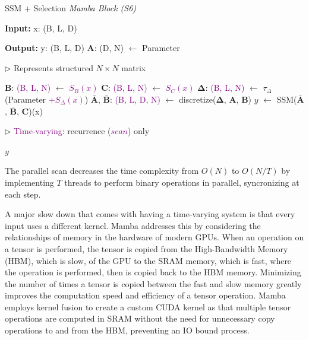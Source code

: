 \documentclass[conference]{IEEEtran}
\newcommand{\mbfb}[1]{\mathbf{\bar{{#1}}}}
\begin{document}
\newcommand{\algorithmicinput}{\textbf{Input:}}
\newcommand{\INPUT}{\item[\algorithmicinput]}
\newcommand{\algorithmicoutput}{\textbf{Output:}}
\newcommand{\OUTPUT}{\item[\algorithmicoutput]}
\begin{algorithm}
    \caption{SSM + Selection \em Mamba Block (S6)}
    \label{selectivescan}
    \begin{algorithmic}[1]
        \INPUT x: (B, L, D)
        \OUTPUT y: (B, L, D)
        \STATE $\mathbf{A}$: (D, N) $\leftarrow$ Parameter \\
        {\begin{flushright}$\triangleright$ Represents structured $N \times N$ matrix\end{flushright}}
        \STATE $\mathbf{B}$: \textcolor{purple}{(B, L, N)} $\leftarrow$ \textcolor{purple}{$S_B(x)$}
        \STATE $\mathbf{C}$: \textcolor{purple}{(B, L, N)} $\leftarrow$ \textcolor{purple}{$S_C(x)$}
        \STATE $\mathbf{\Delta}$: \textcolor{purple}{(B, L, N)} $\leftarrow$ $\tau_\Delta$ (Parameter \textcolor{purple}{$+ S_\Delta(x)$})
        \STATE $\mbfb{A}$, $\mbfb{B}$: \textcolor{purple}{(B, L, D, N)} $\leftarrow$ discretize($\mathbf{\Delta}$, $\mathbf{A}$, $\mathbf{B}$)
        \STATE $y$ $\leftarrow$ SSM($\mbfb{A}$, $\mbfb{B}$, $\mathbf{C}$)(x) \\
        {\begin{flushright}$\triangleright$ \textcolor{purple}{Time-varying}: recurrence (\textcolor{purple}{$scan$}) only\end{flushright}}
        \RETURN $y$
    \end{algorithmic}
\end{algorithm}

The parallel scan decreases the time complexity from $O(N)$ to $O(N/T)$ by implementing $T$ threads to perform binary operations in parallel, syncronizing at each step. 

A major slow down that comes with having a time-varying system is that every input uses a different kernel. Mamba addresses this by considering the relationships of memory in the hardware of modern GPUs. When an operation on a tensor is performed, the tensor is copied from the High-Bandwidth Memory (HBM), which is slow, of the GPU to the SRAM memory, which is fast, where the operation is performed, then is copied back to the HBM memory. Minimizing the number of times a tensor is copied between the fast and slow memory greatly improves the computation speed and efficiency of a tensor operation. Mamba employs kernel fusion to create a custom CUDA kernel as that multiple tensor operations are computed in SRAM without the need for unnecessary copy operations to and from the HBM, preventing an IO bound process.
\end{document}
